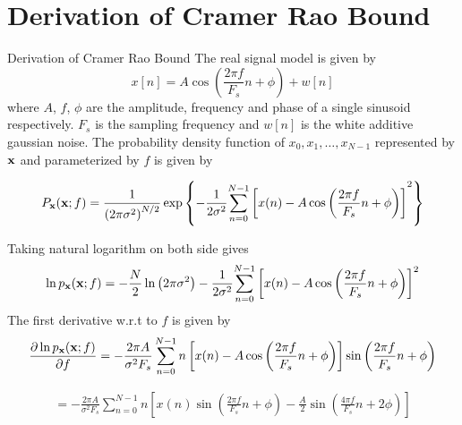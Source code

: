 \chapter{Derivation of Cramer Rao Bound}{Derivation of Cramer Rao Bound}
\renewcommand{\thesection}{C.\arabic{section}}
\label{Appendix:CRB}
The real signal model is given by
\begin{equation}
	\label{model} x[n] = A\cos \left( {\frac{{2\pi f}}{{{F_s}}}n +
		\phi } \right) + w[n]
\end{equation}
where $A$, $f$, $\phi$ are the amplitude, frequency and phase of a
single sinusoid respectively. $F_s$ is the sampling frequency and
$w[n]$ is the white additive gaussian noise. The probability
density function of ${x_0},{x_1}, \ldots ,{x_{N - 1}}$ represented
by $\bf{x}$ and parameterized by $f$ is given by

\begin{align}
	{P_{\bf{x}}}({\bf{x}};f) = \frac{1}{{{{\left( {2\pi {\sigma ^2}}
					\right)}^{N/2}}}}\exp \left\{ { - \frac{1}{{2{\sigma
					^2}}}{{\sum\limits_{n = 0}^{N - 1} {\left[ {x(n) - A\cos \left(
						{\frac{{2\pi f}}{{{F_s}}}n + \phi } \right)} \right]} }^2}}
	\right\}
\end{align}

Taking natural logarithm on both side gives
\begin{align}
	\ln {p_{\bf{x}}}({\bf{x}};f) =  - \frac{N}{2}\ln \left( {2\pi
		{\sigma ^2}} \right) - \frac{1}{{2{\sigma ^2}}}{\sum\limits_{n =
			0}^{N - 1} {\left[ {x(n) - A\cos \left( {\frac{{2\pi f}}{{{F_s}}}n
					+ \phi } \right)} \right]} ^2}
\end{align}
The first derivative w.r.t to $f$ is given by
\begin{align}
	\frac{{\partial \ln {p_{\bf{x}}}({\bf{x}};f)}}{{\partial f}} =  -
	\frac{{2\pi A}}{{{\sigma ^2}{F_s}}}\sum\limits_{n = 0}^{N - 1}
	{n\left[ {x(n) - A\cos \left( {\frac{{2\pi f}}{{{F_s}}}n + \phi }
			\right)} \right]} \sin \left( {\frac{{2\pi f}}{{{F_s}}}n + \phi }
	\right)
\end{align}

\begin{align}
	= - \frac{{2\pi A}}{{{\sigma ^2}{F_s}}}\sum\limits_{n = 0}^{N - 1}
	{n\left[ {x(n)\sin \left( {\frac{{2\pi f}}{{{F_s}}}n + \phi }
			\right) - \frac{A}{2}\sin \left( {\frac{{4\pi f}}{{{F_s}}}n +
				2\phi } \right)} \right]}
\end{align}

